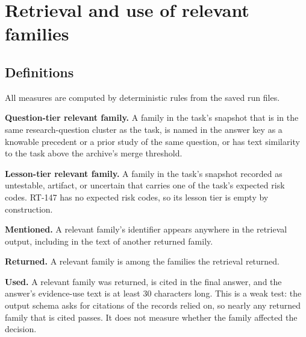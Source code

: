 \documentclass[11pt]{article}
\begin{document}
\section{Retrieval and use of relevant families}
\label{app:retrieval}

\subsection*{Definitions}

All measures are computed by deterministic rules from the saved run files.

\textbf{Question-tier relevant family.} A family in the task's snapshot that is in the same research-question cluster as the task, is named in the answer key as a knowable precedent or a prior study of the same question, or has text similarity to the task above the archive's merge threshold.

\textbf{Lesson-tier relevant family.} A family in the task's snapshot recorded as untestable, artifact, or uncertain that carries one of the task's expected risk codes. RT-147 has no expected risk codes, so its lesson tier is empty by construction.

\textbf{Mentioned.} A relevant family's identifier appears anywhere in the retrieval output, including in the text of another returned family.

\textbf{Returned.} A relevant family is among the families the retrieval returned.

\textbf{Used.} A relevant family was returned, is cited in the final answer, and the answer's evidence-use text is at least 30 characters long. This is a weak test: the output schema asks for citations of the records relied on, so nearly any returned family that is cited passes. It does not measure whether the family affected the decision.
\end{document}
